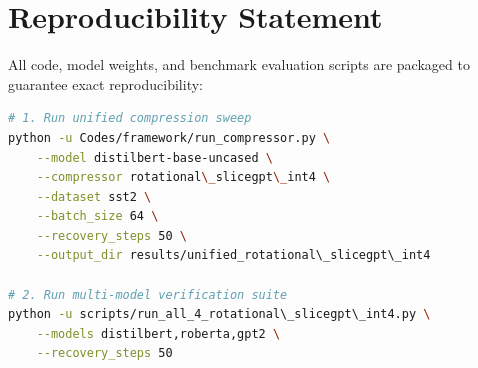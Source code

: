 \section{Reproducibility Statement}
All code, model weights, and benchmark evaluation scripts are packaged to guarantee exact reproducibility:
\begin{lstlisting}[language=bash]
# 1. Run unified compression sweep
python -u Codes/framework/run_compressor.py \
    --model distilbert-base-uncased \
    --compressor rotational\_slicegpt\_int4 \
    --dataset sst2 \
    --batch_size 64 \
    --recovery_steps 50 \
    --output_dir results/unified_rotational\_slicegpt\_int4

# 2. Run multi-model verification suite
python -u scripts/run_all_4_rotational\_slicegpt\_int4.py \
    --models distilbert,roberta,gpt2 \
    --recovery_steps 50
\end{lstlisting}
